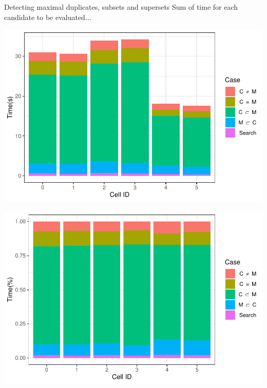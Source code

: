 \documentclass{beamer}
\begin{document}
\begin{frame}{Detecting maximal duplicates, subsets and supersets}
        {Sum of time for each candidate to be evaluated...}
        \centering
        \begin{minipage}{0.49\textwidth}
                \includegraphics[width=\textwidth]{figures/Maximals/performanceBySum1}
        \end{minipage} %
        \begin{minipage}{0.49\textwidth}
                \includegraphics[width=\textwidth]{figures/Maximals/performanceBySum2}
        \end{minipage}
\end{frame}
\end{document}
